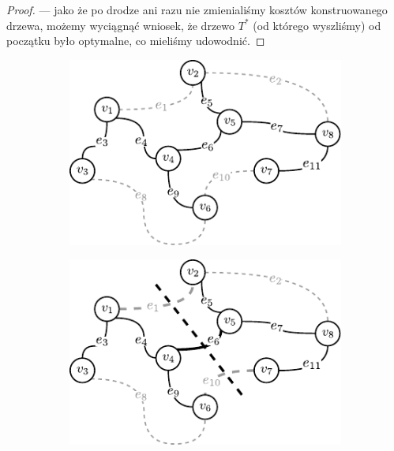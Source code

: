 \begin{proof}
--- jako że po drodze ani razu nie zmienialiśmy kosztów konstruowanego drzewa, możemy wyciągnąć wniosek, że drzewo $T^{\ast}$ (od którego wyszliśmy) od początku było optymalne, co mieliśmy udowodnić.
\end{proof}

\begin{figure}[!htbp]
	\null\hfill
	\begin{subfigure}[b]{0.32\textwidth}
		\includegraphics[width=\textwidth]{Chapter_I/CUT-example/a}
		\caption{}
		\label{fig:cut:a}
	\end{subfigure}
	\hfill
	\begin{subfigure}[b]{0.32\textwidth}
		\includegraphics[width=\textwidth]{Chapter_I/CUT-example/b}
		\caption{}
		\label{fig:cut:b}
	\end{subfigure}
	\hfill
	\begin{subfigure}[b]{0.32\textwidth}

\end{subfigure}
\end{figure}
